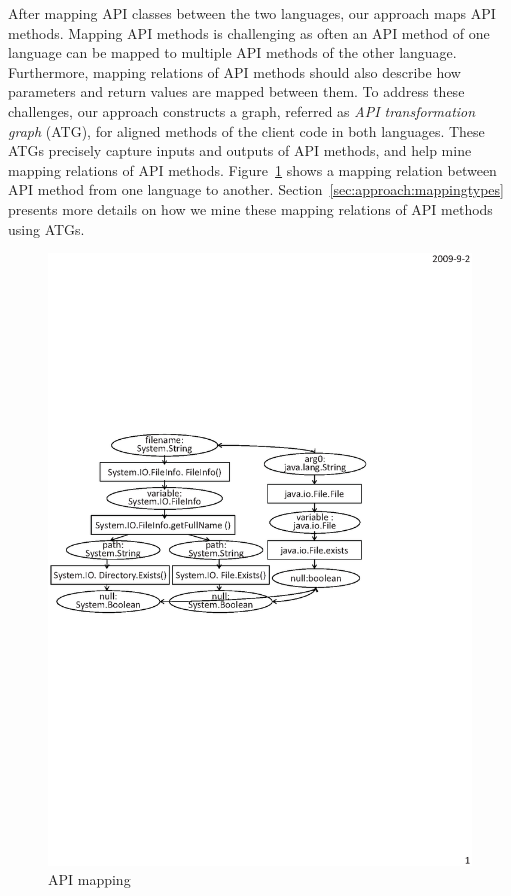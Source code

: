 After mapping API classes between the two languages, our approach maps
API methods. Mapping API methods is challenging as often an API method of one language
can be mapped to multiple API methods of the other language. Furthermore,
mapping relations of API methods should also describe how parameters and return
values are mapped between them. To address these challenges, our approach constructs a
graph, referred as \emph{API transformation graph} (ATG), for
aligned methods of the client code in both languages. These ATGs
precisely capture inputs and outputs of API methods, and help mine
mapping relations of API methods. Figure~\ref{fig:example} shows a mapping
relation between API method  from one language to another.
Section~\ref{sec:approach:mappingtypes} presents more details on how we mine these mapping relations
of API methods using ATGs.

\begin{figure}[t]
\centering
\includegraphics[scale=0.65,clip]{figure/sample.eps}\vspace*{-3ex}
 \caption
{\label{fig:example}API mapping}\vspace*{-3ex}
\end{figure}

